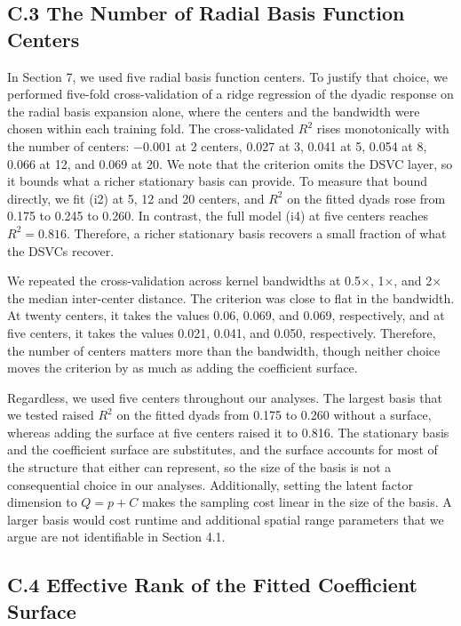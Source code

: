 \documentclass{article}
\begin{document}
\subsection*{C.3 The Number of Radial Basis Function Centers}
 
In Section 7, we used five radial basis function centers. To justify that choice, we performed five-fold cross-validation of a ridge regression of the dyadic response on the radial basis expansion alone, where the centers and the bandwidth were chosen within each training fold.
The cross-validated $R^2$ rises monotonically with the number of centers: $-0.001$ at 2 centers, 0.027 at 3, 0.041 at 5, 0.054 at 8, 0.066 at 12, and 0.069 at 20.
We note that the criterion omits the DSVC layer, so it bounds what a richer stationary basis can provide. To measure that bound directly, we fit (i2) at 5, 12 and 20 centers, and $R^2$ on the fitted dyads rose from 0.175 to 0.245 to 0.260. In contrast, the full model (i4) at five centers reaches $R^2=0.816$. 
Therefore, a richer stationary basis recovers a small fraction of what the DSVCs recover.

We repeated the cross-validation across kernel bandwidths at 0.5$\times$, 1$\times$, and 2$\times$ the median inter-center distance. The criterion was close to flat in the bandwidth. At twenty centers, it takes the values 0.06, 0.069, and 0.069, respectively, and at five centers, it takes the values 0.021, 0.041, and 0.050, respectively. Therefore, the number of centers matters more than the bandwidth, though neither choice moves the criterion by as much as adding the coefficient surface.
 
Regardless, we used five centers throughout our analyses.
The largest basis that we tested raised $R^2$ on the fitted dyads from 0.175 to 0.260 without a surface, whereas adding the surface at five centers raised it to 0.816. The stationary basis and the coefficient surface are substitutes, and the surface accounts for most of the structure that either can represent, so the size of the basis is not a consequential choice in our analyses. Additionally, setting the latent factor dimension to $Q=p+C$ makes the sampling cost linear in the size of the basis. A larger basis would cost runtime and additional spatial range parameters that we argue are not identifiable in Section 4.1.
 
\subsection*{C.4 Effective Rank of the Fitted Coefficient Surface}
\end{document}
